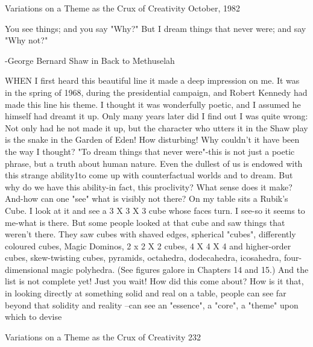                              Variations on a Theme
                            as the Crux of Creativity
                                    October, 1982

                             You see things; and you say "Why?"
                             But I dream things that never were; and say "Why not?"

                                     -George Bernard Shaw in Back to Methuselah


WHEN I first heard this beautiful line it made a deep impression on me. It was in
the spring of 1968, during the presidential campaign, and Robert Kennedy had made
this line his theme. I thought it was wonderfully poetic, and I assumed he himself had
dreamt it up. Only many years later did I find out I was quite wrong: Not only had he
not made it up, but the character who utters it in the Shaw play is the snake in the
Garden of Eden! How disturbing! Why couldn't it have been the way I thought?
         "To dream things that never were"-this is not just a poetic phrase, but a truth
about human nature. Even the dullest of us is endowed with this strange ability1to
come up with counterfactual worlds and to dream. But why do we have this ability-in
fact, this proclivity? What sense does it make? And-how can one "see" what is visibly
not there?
         On my table sits a Rubik's Cube. I look at it and see a 3 X 3 X 3 cube whose
faces turn. I see-so it seems to me-what is there. But some people looked at that cube
and saw things that weren't there. They saw cubes with shaved edges, spherical
"cubes", differently coloured cubes, Magic Dominos, 2 x 2 X 2 cubes, 4 X 4 X 4 and
higher-order cubes, skew-twisting cubes, pyramids, octahedra, dodecahedra,
icosahedra, four-dimensional magic polyhedra. (See figures galore in Chapters 14 and
15.) And the list is not complete yet! Just you wait!
         How did this come about? How is it that, in looking directly at something solid
and real on a table, people can see far beyond that solidity and reality --can see an
"essence", a "core", a "theme" upon which to devise




Variations on a Theme as the Crux of Creativity                                     232

